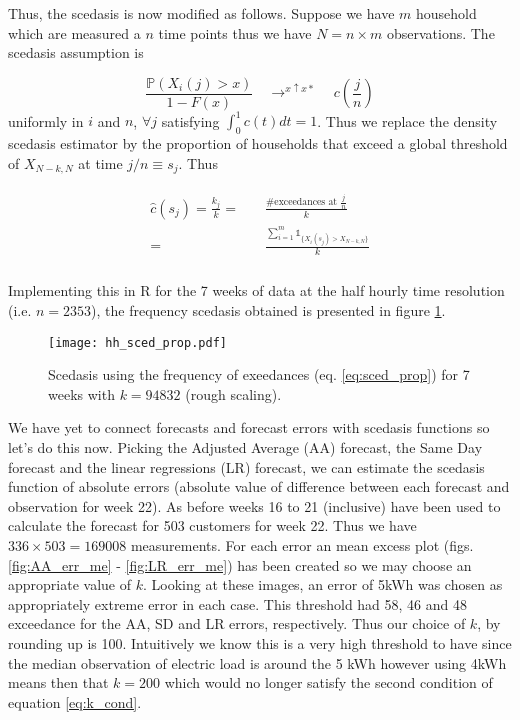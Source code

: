 \documentclass[a4paper]{article}
\begin{document}
Thus, the scedasis is now modified as follows. Suppose we have $m$ household which are measured a $n$ time points thus we have $N= n \times m$ observations. The scedasis assumption is

\begin{equation*}
\frac{\mathbb{P}(X_i(j)>x)}{1-F(x)} \quad  \displaystyle{ \mathop{\rightarrow}^{x \uparrow x*}} \quad c\left(\frac{j}{n}\right)
\end{equation*}
\noindent uniformly in $i$ and $n$, $\forall j$ satisfying $\int_0^1 c(t)dt = 1$. Thus we replace the density scedasis estimator by the proportion of households that exceed a global threshold of $X_{N-k,N}$ at time $j/n \equiv s_j$. Thus

\begin{align} \label{eq:sced_prop}
\begin{split}
\hat{c}(s_j) =  \frac{k_j}{k} =& \quad \frac{\# \text{exceedances at } \frac{j}{n}}{k} \\
= & \quad \frac{\sum_{i=1}^m \mathbb{1}_{\{X_i(s_j) > X_{N-k,N}\}}}{k}\\
\end{split}
\end{align}

Implementing this in R for the 7 weeks of data at the half hourly time resolution (i.e. $n = 2353$), the frequency scedasis obtained is presented in figure \ref{fig:hh_sced_prop}.

\begin{figure}
\centering
\texttt{[image: hh\_sced\_prop.pdf]}
\caption{\label{fig:hh_sced_prop} Scedasis using the frequency of exeedances (eq. \ref{eq:sced_prop}) for 7 weeks with $k=94832$ (rough scaling).}
\end{figure}

We have yet to connect forecasts and forecast errors with scedasis functions so let's do this now. Picking the Adjusted Average (AA) forecast, the Same Day forecast and the linear regressions (LR) forecast, we can estimate the scedasis function of absolute errors (absolute value of difference between each forecast and observation for week 22). As before weeks 16 to 21 (inclusive) have been used to calculate the forecast for 503 customers for week 22. Thus we have $336 \times 503 = 169008$ measurements. For each error an mean excess plot (figs. \ref{fig:AA_err_me} - \ref{fig:LR_err_me}) has been created so we may choose an appropriate value of $k$. Looking at these images, an error of 5kWh was chosen as appropriately extreme error in each case. This threshold had 58, 46 and 48 exceedance for the AA, SD and LR errors, respectively. Thus our choice of $k$, by rounding up is 100. Intuitively we know this is a very high threshold to have since the median observation of electric load is around the 5 kWh however using 4kWh means then that $k=200$ which would no longer satisfy the second condition of equation \ref{eq:k_cond}. 
\end{document}
